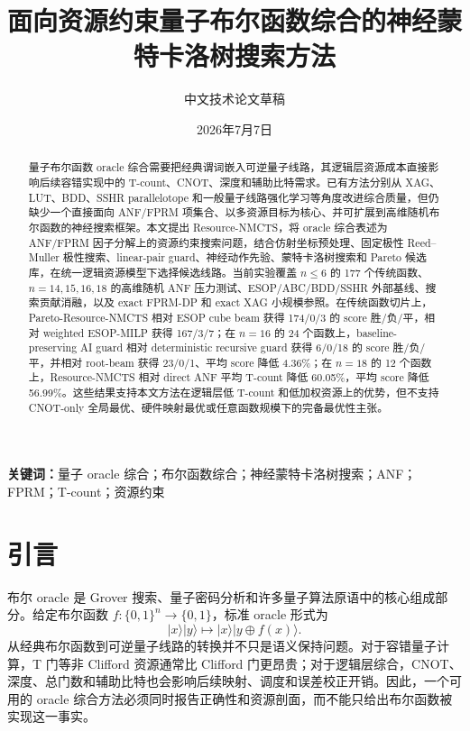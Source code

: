 \documentclass[UTF8,fontset=macnew,11pt]{ctexart}
\title{面向资源约束量子布尔函数综合的神经蒙特卡洛树搜索方法}
\author{中文技术论文草稿}
\date{2026年7月7日}
\newcommand{\method}{Resource-NMCTS}
\newcommand{\pareto}{Pareto-Resource-NMCTS}
\begin{document}
\maketitle

\begin{abstract}
量子布尔函数 oracle 综合需要把经典谓词嵌入可逆量子线路，其逻辑层资源成本直接影响后续容错实现中的 T-count、CNOT、深度和辅助比特需求。已有方法分别从 XAG、LUT、BDD、SSHR parallelotope 和一般量子线路强化学习等角度改进综合质量，但仍缺少一个直接面向 ANF/FPRM 项集合、以多资源目标为核心、并可扩展到高维随机布尔函数的神经搜索框架。本文提出 \method{}，将 oracle 综合表述为 ANF/FPRM 因子分解上的资源约束搜索问题，结合仿射坐标预处理、固定极性 Reed--Muller 极性搜索、linear-pair guard、神经动作先验、蒙特卡洛树搜索和 Pareto 候选库，在统一逻辑资源模型下选择候选线路。当前实验覆盖 $n\leq 6$ 的 177 个传统函数、$n=14,15,16,18$ 的高维随机 ANF 压力测试、ESOP/ABC/BDD/SSHR 外部基线、搜索贡献消融，以及 exact FPRM-DP 和 exact XAG 小规模参照。在传统函数切片上，\pareto{} 相对 ESOP cube beam 获得 174/0/3 的 score 胜/负/平，相对 weighted ESOP-MILP 获得 167/3/7；在 $n=16$ 的 24 个函数上，baseline-preserving AI guard 相对 deterministic recursive guard 获得 6/0/18 的 score 胜/负/平，并相对 root-beam 获得 23/0/1、平均 score 降低 4.36\%；在 $n=18$ 的 12 个函数上，\method{} 相对 direct ANF 平均 T-count 降低 60.05\%，平均 score 降低 56.99\%。这些结果支持本文方法在逻辑层低 T-count 和低加权资源上的优势，但不支持 CNOT-only 全局最优、硬件映射最优或任意函数规模下的完备最优性主张。
\end{abstract}

\noindent\textbf{关键词：}量子 oracle 综合；布尔函数综合；神经蒙特卡洛树搜索；ANF；FPRM；T-count；资源约束

\section{引言}

布尔 oracle 是 Grover 搜索、量子密码分析和许多量子算法原语中的核心组成部分。给定布尔函数 $f:\{0,1\}^{n}\rightarrow\{0,1\}$，标准 oracle 形式为
\begin{equation}
  |x\rangle|y\rangle\mapsto |x\rangle|y\oplus f(x)\rangle .
\end{equation}
从经典布尔函数到可逆量子线路的转换并不只是语义保持问题。对于容错量子计算，T 门等非 Clifford 资源通常比 Clifford 门更昂贵；对于逻辑层综合，CNOT、深度、总门数和辅助比特也会影响后续映射、调度和误差校正开销。因此，一个可用的 oracle 综合方法必须同时报告正确性和资源剖面，而不能只给出布尔函数被实现这一事实。
\end{document}
